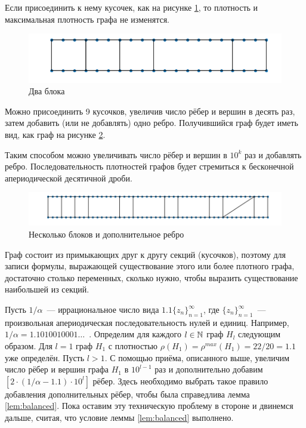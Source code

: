 Если присоединить к нему кусочек, как на рисунке \ref{fig:2 blocks}, то плотность и максимальная плотность графа не изменятся.

\begin{figure}
  \centering
  \includegraphics[scale=0.5]{picrel/2_blocks.png}
  \caption{Два блока}
  \label{fig:2 blocks}
\end{figure}

Можно присоединить 9 кусочков, увеличив число рёбер и 
вершин в десять раз, затем добавить (или не добавлять) одно ребро. Получившийся граф будет иметь вид, как граф на рисунке \ref{fig:additional edge}.

Таким способом можно увеличивать число рёбер и вершин в $10^k$ раз и добавлять ребро.
Последовательность плотностей графов будет стремиться к бесконечной апериодической десятичной дроби.

\begin{figure}
  \includegraphics[scale=0.5]{picrel/additional_edge.png}
  \caption{Несколько блоков и дополнительное ребро}
  \label{fig:additional edge}
\end{figure}

Граф состоит из примыкающих друг к другу секций (кусочков), поэтому для записи формулы, выражающей существование этого или более плотного графа, достаточно столько переменных, сколько нужно, чтобы выразить существование наибольшей из секций.


Пусть $1/\alpha$~--- иррациональное число вида $1.1\{z_n\}_{n=1}^\infty$, где $\{z_n\}_{n=1}^\infty$~--- произвольная апериодическая последовательность нулей и единиц. 
Например, $1/\alpha = 1.1010010001\ldots$~.
Определим для каждого $l \in \mathbb {N}$ граф $H_l$ следующим образом.
Для $l = 1$ граф $H_1$ с плотностью $\rho(H_1) = \rho^{max}(H_1) = 22/20 = 1.1$  уже определён.
Пусть $l > 1$.
С помощью приёма, описанного выше, увеличим число рёбер и вершин графа $H_1$ в 
$10^{l-1}$ раз и дополнительно добавим $[2\cdot(1/\alpha - 1.1)\cdot 10^{l}]$ рёбер.
Здесь необходимо выбрать такое правило добавления дополнительных рёбер, чтобы была справедлива лемма \ref{lem:balanced}.
Пока оставим эту техническую проблему в стороне и двинемся дальше, считая, что условие леммы \ref{lem:balanced} выполнено.

